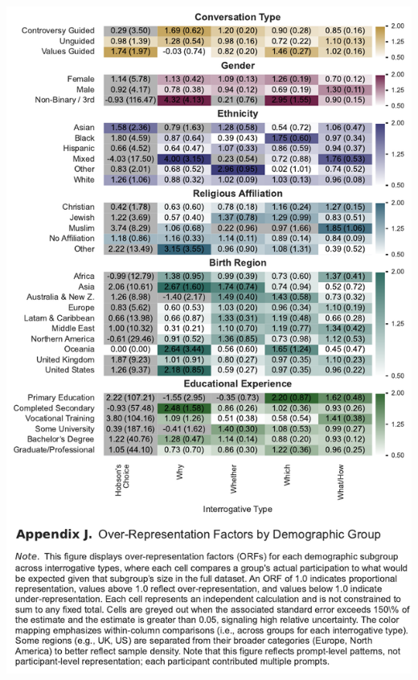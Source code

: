\documentclass[
  12pt,
]{article}
\begin{document}
\begin{center}\includegraphics{../03_outputs/02_descriptive_analyses/appendix_j} \end{center}
\end{document}
